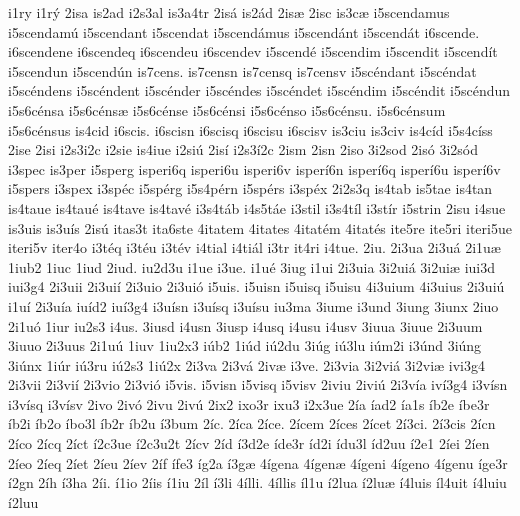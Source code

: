 {i1ry
i1r^^fd
2isa
is2ad
i2s3al
is3a4tr
2is^^e1
is2^^e1d
2is^^e6
2isc
is3c^^e6
i5scendamus
i5scendam^^fa
i5scendant
i5scendat
i5scend^^e1mus
i5scend^^e1nt
i5scend^^e1t
i6scende.
i6scendene
i6scendeq
i6scendeu
i6scendev
i5scend^^e9
i5scendim
i5scendit
i5scend^^edt
i5scendun
i5scend^^fan
is7cens.
is7censn
is7censq
is7censv
i5sc^^e9ndant
i5sc^^e9ndat
i5sc^^e9ndens
i5sc^^e9ndent
i5sc^^e9nder
i5sc^^e9ndes
i5sc^^e9ndet
i5sc^^e9ndim
i5sc^^e9ndit
i5sc^^e9ndun
i5s6c^^e9nsa
i5s6c^^e9ns^^e6
i5s6c^^e9nse
i5s6c^^e9nsi
i5s6c^^e9nso
i5s6c^^e9nsu.
i5s6c^^e9nsum
i5s6c^^e9nsus
is4cid
i6scis.
i6scisn
i6scisq
i6scisu
i6scisv
is3ciu
is3civ
is4c^^edd
i5s4c^^edss
2ise
2isi
i2s3i2c
i2sie
is4iue
i2si^^fa
2is^^ed
i2s3^^ed2c
2ism
2isn
2iso
3i2sod
2is^^f3
3i2s^^f3d
i3spec
is3per
i5sperg
isperi6q
isperi6u
isperi6v
isper^^ed6n
isper^^ed6q
isper^^ed6u
isper^^ed6v
i5spers
i3spex
i3sp^^e9c
i5sp^^e9rg
i5s4p^^e9rn
i5sp^^e9rs
i3sp^^e9x
2i2s3q
is4tab
is5tae
is4tan
is4taue
is4tau^^e9
is4tave
is4tav^^e9
i3s4t^^e1b
i4s5t^^e1e
i3stil
i3s4t^^edl
i3st^^edr
i5strin
2isu
i4sue
is3uis
is3u^^eds
2is^^fa
itas3t
ita6ste
4itatem
4itates
4itat^^e9m
4itat^^e9s
ite5re
ite5ri
iteri5ue
iteri5v
iter4o
i3t^^e9q
i3t^^e9u
i3t^^e9v
i4tial
i4ti^^e1l
i3tr
it4ri
i4tue.
2iu.
2i3ua
2i3u^^e1
2i1u^^e6
1iub2
1iuc
1iud
2iud.
iu2d3u
i1ue
i3ue.
i1u^^e9
3iug
i1ui
2i3uia
3i2ui^^e1
3i2ui^^e6
iui3d
iui3g4
2i3uii
2i3ui^^ed
2i3uio
2i3ui^^f3
i5uis.
i5uisn
i5uisq
i5uisu
4i3uium
4i3uius
2i3ui^^fa
i1u^^ed
2i3u^^eda
iu^^edd2
iu^^ed3g4
i3u^^edsn
i3u^^edsq
i3u^^edsu
iu3ma
3iume
i3und
3iung
3iunx
2iuo
2i1u^^f3
1iur
iu2s3
i4us.
3iusd
i4usn
3iusp
i4usq
i4usu
i4usv
3iuua
3iuue
2i3uum
3iuuo
2i3uus
2i1u^^fa
1iuv
1iu2x3
i^^fab2
1i^^fad
i^^fa2du
3i^^fag
i^^fa3lu
i^^fam2i
i3^^fand
3i^^fang
3i^^fanx
1i^^far
i^^fa3ru
i^^fa2s3
1i^^fa2x
2i3va
2i3v^^e1
2iv^^e6
i3ve.
2i3via
3i2vi^^e1
3i2vi^^e6
ivi3g4
2i3vii
2i3vi^^ed
2i3vio
2i3vi^^f3
i5vis.
i5visn
i5visq
i5visv
2iviu
2ivi^^fa
2i3v^^eda
iv^^ed3g4
i3v^^edsn
i3v^^edsq
i3v^^edsv
2ivo
2iv^^f3
2ivu
2iv^^fa
2ix2
ixo3r
ixu3
i2x3ue
2^^eda
^^edad2
^^eda1s
^^edb2e
^^edbe3r
^^edb2i
^^edb2o
^^edbo3l
^^edb2r
^^edb2u
^^ed3bum
2^^edc.
2^^edca
2^^edce.
2^^edcem
2^^edces
2^^edcet
2^^ed3ci.
2^^ed3cis
2^^edcn
2^^edco
2^^edcq
2^^edct
^^ed2c3ue
^^ed2c3u2t
2^^edcv
2^^edd
^^ed3d2e
^^edde3r
^^edd2i
^^eddu3l
^^edd2uu
^^ed2e1
2^^edei
2^^eden
2^^edeo
2^^edeq
2^^edet
2^^edeu
2^^edev
2^^edf
^^edfe3
^^edg2a
^^ed3g^^e6
4^^edgena
4^^edgen^^e6
4^^edgeni
4^^edgeno
4^^edgenu
^^edge3r
^^ed2gn
2^^edh
^^ed3ha
2^^edi.
^^ed1io
2^^edis
^^ed1iu
2^^edl
^^ed3li
4^^edlli.
4^^edllis
^^edl1u
^^ed2lua
^^ed2lu^^e6
^^ed4luis
^^edl4uit
^^ed4luiu
^^ed2luu
}

